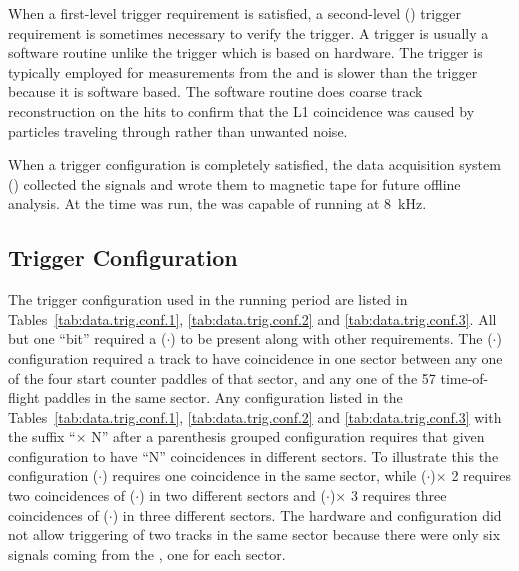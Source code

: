 When a first-level trigger requirement is satisfied, a second-level () trigger requirement is sometimes necessary to verify the  trigger. A  trigger is usually a software routine unlike the  trigger which is based on hardware. The  trigger is typically employed for measurements from the  and is slower than the  trigger because it is software based. The software routine does coarse track reconstruction on the  hits to confirm that the L1 coincidence was caused by particles traveling through \clas rather than unwanted noise.

When a trigger configuration is completely satisfied, the data acquisition system () collected the signals and wrote them to magnetic tape for future offline analysis. At the time  was run, the  was capable of running at 8~kHz.

\subsection{ Trigger Configuration} \label{sec:data.trig}
The trigger configuration used in the  running period are listed in Tables~\ref{tab:data.trig.conf.1}, \ref{tab:data.trig.conf.2} and \ref{tab:data.trig.conf.3}. All but one ``bit'' required a ($\cdot$) to be present along with other requirements. The ($\cdot$) configuration required a track to have coincidence in one sector between any one of the four start counter paddles of that sector, and any one of the 57 time-of-flight paddles in the same sector. Any configuration listed in the Tables~\ref{tab:data.trig.conf.1}, \ref{tab:data.trig.conf.2} and \ref{tab:data.trig.conf.3} with the suffix ``$\times$ N'' after a parenthesis grouped configuration requires that given configuration to have ``N'' coincidences in different sectors. To illustrate this the configuration ($\cdot$) requires one coincidence in the same sector, while ($\cdot$)$\times$ 2 requires two coincidences of ($\cdot$) in two different sectors and ($\cdot$)$\times$ 3 requires three coincidences of ($\cdot$) in three different sectors. The hardware and configuration did not allow triggering of two tracks in the same sector because there were only six signals coming from the , one for each sector. 

